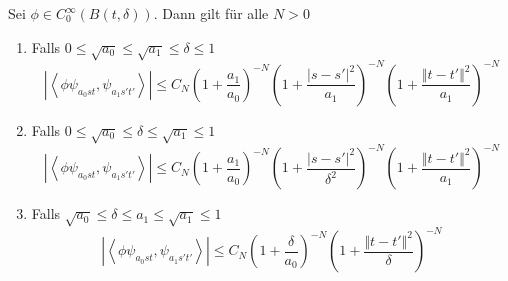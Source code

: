 \begin{lemma}
\label{lemm:lemma57}
Sei $\phi \in C_0^\infty(B(t,\delta))$. Dann gilt für alle $N>0$

\begin{enumerate}
    \item Falls $0 \leq \sqrt{a_0} \leq \sqrt{a_1}\leq \delta \leq 1$
    \begin{equation*}
        |\left<\phi \psi_{a_0st},\psi_{a_1s't'}\right>| \leq
        C_N \left(1+\frac{a_1}{a_0}\right)^{-N}
        \left(1+\frac{|s-s'|^2}{a_1}\right)^{-N}
        \left(1+\frac{\Vert t-t' \Vert^2}{a_1}\right)^{-N}
    \end{equation*}
    \item Falls $0 \leq \sqrt{a_0} \leq \delta \leq \sqrt{a_1} \leq 1$
    \begin{equation*}
        |\left<\phi \psi_{a_0st},\psi_{a_1s't'}\right>| \leq
        C_N \left(1+\frac{a_1}{a_0}\right)^{-N}
        \left(1+\frac{|s-s'|^2}{\delta^2}\right)^{-N}
        \left(1+\frac{\Vert t-t' \Vert^2}{a_1}\right)^{-N}
    \end{equation*}
    \item Falls $\sqrt{a_0} \leq \delta \leq a_1 \leq \sqrt{a_1} \leq 1$
    \begin{equation*}
        |\left<\phi \psi_{a_0st},\psi_{a_1s't'}\right>| \leq
        C_N \left(1+\frac{\delta}{a_0}\right)^{-N}
        \left(1+\frac{\Vert t-t' \Vert^2}{\delta}\right)^{-N}
    \end{equation*}
\end{enumerate}
\end{lemma}



